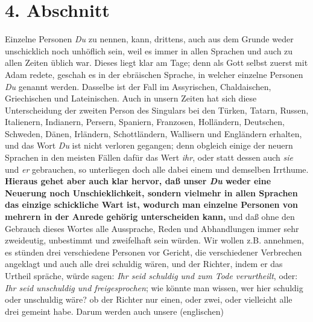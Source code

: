 \section{4. Abschnitt} \label{kap10_ab4}

Einzelne Personen \textit{Du} zu nennen, kann, drittens, auch aus dem Grunde weder
unschicklich noch unhöflich sein, weil es immer in allen Sprachen und auch zu
allen Zeiten üblich war. Dieses liegt klar am Tage; denn als Gott selbst zuerst
mit Adam redete, geschah es in der ebräischen Sprache, in welcher einzelne
Personen \textit{Du} genannt werden. Dasselbe ist der Fall im Assyrischen,
Chaldaischen, Griechischen und Lateinischen. Auch in unsern Zeiten hat sich
diese Unterscheidung der zweiten Person des Singulars bei den Türken, Tatarn,
Russen, Italienern, Indianern, Persern, Spaniern, Franzosen, Holländern,
Deutschen, Schweden, Dänen, Irländern, Schottländern, Wallisern
 und Engländern erhalten, und das Wort \textit{Du} ist nicht verloren gegangen;
denn obgleich einige der neuern Sprachen in den meisten Fällen dafür das Wert
\textit{ihr}, oder statt dessen auch \textit{sie} und \textit{er} gebrauchen, so unterliegen
doch alle dabei einem und demselben Irrthume. \textbf{Hieraus gehet aber auch klar
hervor, daß unser \textit{Du} weder eine Neuerung noch Unschieklichkeit, sondern
vielmehr in allen Sprachen das einzige schickliche Wart ist, wodurch man
einzelne Personen von mehrern in der Anrede gehörig unterscheiden kann,} und daß
ohne den Gebrauch dieses Wortes alle Aussprache, Reden und Abhandlungen immer
sehr zweideutig, unbestimmt und zweifelhaft sein würden. Wir wollen z.B.
annehmen, es stünden drei verschiedene Personen vor Gericht, die verschiedener
Verbrechen angeklagt und auch alle drei schuldig wären, und der Richter, indem
er das Urtheil spräche, würde sagen: \textit{Ihr seid schuldig und zum Tode verurtheilt},
oder: \textit{Ihr seid unschuldig und freigesprochen}; wie könnte man wissen, wer hier
schuldig oder unschuldig wäre? ob der Richter nur einen, oder zwei, oder
vielleicht alle drei gemeint habe. Darum werden auch unsere (englischen)
